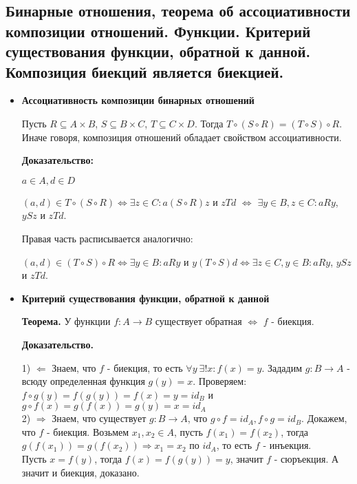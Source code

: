 \subsection{Бинарные отношения, теорема об ассоциативности композиции отношений. Функции. Критерий существования функции, обратной к данной. Композиция биекций является биекцией.}

\begin{itemize}
	\item \textbf{Ассоциативность композиции бинарных отношений}
	
	Пусть $R \subseteq A \times B$, $S \subseteq B \times C$, $T \subseteq C \times D$. Тогда $T \circ (S \circ R) = (T \circ S) \circ R$. Иначе говоря, композиция отношений обладает свойством ассоциативности.

	\textbf{Доказательство:}
	
	$a \in A, d \in D$
	
	$(a, d) \in T \circ (S \circ R) \Leftrightarrow \exists z \in C: a(S \circ R)z$ и $zTd$ $\Leftrightarrow$ $\exists y \in B, z \in C: aRy$, $ySz$ и $zTd$.
	
	Правая часть расписывается аналогично:
	
	$(a, d) \in (T \circ S) \circ R \Leftrightarrow \exists y \in B: aRy$ и $y(T \circ S)d \Leftrightarrow \exists z \in C, y \in B: aRy$, $ySz$ и $zTd$.
	
	\item \textbf{Критерий существования функции, обратной к данной}
	
	\textbf{Теорема.} У функции $f : A \to B$ существует обратная $\Leftrightarrow$ $f$ - биекция.
	
	\textbf{Доказательство.} 
	
	1) $\Leftarrow$ Знаем, что $f$ - биекция, то есть $\forall y\ \exists! x : f(x) = y$. Зададим $g : B \to A$ - всюду определенная функция $g(y) = x$. Проверяем: $f \circ g (y) = f (g(y)) = f(x) = y = id_B$ и $g \circ f(x) = g(f(x)) = g(y) = x = id_A$ \\
	
	2) $\Rightarrow$ Знаем, что существует $g : B \to A$, что $g \circ f = id_A, f \circ g = id_B$. Докажем, что $f$ - биекция. Возьмем $x_1, x_2 \in A$, пусть $f(x_1) = f(x_2)$, тогда $g(f(x_1))  = g(f(x_2)) \Rightarrow x_1 = x_2$ по $id_A$, то есть $f$ - инъекция. \\
	
	Пусть $x = f(y)$, тогда $f(x) = f(g(y)) = y$, значит $f$ - сюръекция. А значит и биекция, доказано.
	

\end{itemize}
